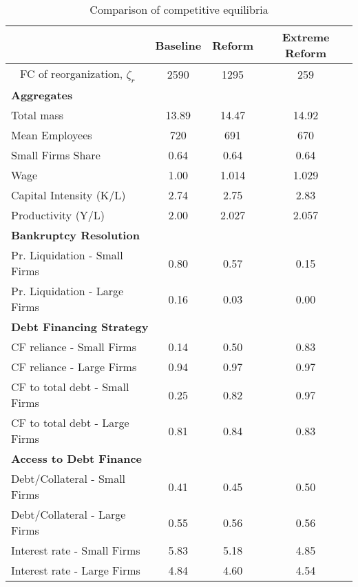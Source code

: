 \documentclass[12pt]{article}
\begin{document}
\begin{table}[h!]
    \centering
    \begin{tabular}{lccc}
    & \textbf{Baseline} & \textbf{Reform} & \textbf{Extreme Reform} \\    
    \toprule
    \multicolumn{1}{c}{FC of reorganization, $\zeta_{r}$} & 2590 & 1295 & 259  \vspace{3mm} \\  
    \multicolumn{4}{l}{\textbf{Aggregates}} \\ \hline
    Total mass & 13.89 & 14.47 & 14.92  \\
    Mean Employees & 720 & 691 & 670  \\
    Small Firms Share  & 0.64 & 0.64 & 0.64  \\
    Wage & 1.00 & 1.014 & 1.029  \\
    Capital Intensity (K/L) & 2.74 & 2.75 & 2.83  \\
    Productivity (Y/L) & 2.00 & 2.027 & 2.057  \vspace{3mm} \\  
    \multicolumn{4}{l}{\textbf{Bankruptcy Resolution}} \\ \hline
    Pr. Liquidation - Small Firms & 0.80 & 0.57 & 0.15  \\
    Pr. Liquidation - Large Firms & 0.16 & 0.03 & 0.00  \vspace{3mm} \\  
    \multicolumn{4}{l}{\textbf{Debt Financing Strategy}} \\ \hline
    CF reliance - Small Firms & 0.14 & 0.50 & 0.83  \\
    CF reliance - Large Firms & 0.94 & 0.97 & 0.97  \vspace{1mm} \\  
    CF to total debt - Small Firms & 0.25 & 0.82 & 0.97  \\
    CF to total debt - Large Firms & 0.81 & 0.84 & 0.83  \vspace{3mm} \\  
    \multicolumn{4}{l}{\textbf{Access to Debt Finance}} \\ \hline
    Debt/Collateral - Small Firms & 0.41 & 0.45 & 0.50 \\
    Debt/Collateral - Large Firms & 0.55 & 0.56 & 0.56  \vspace{1mm} \\  
    Interest rate - Small Firms & 5.83 & 5.18 & 4.85  \\
    Interest rate - Large Firms & 4.84 & 4.60 & 4.54  \\  \bottomrule
    \end{tabular}
    \caption{Comparison of competitive equilibria}
    \label{tab:SSvalues}
\end{table}
\end{document}
